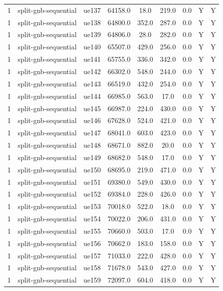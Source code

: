\begin{table}[ht]
\begin{tabular}{|c|c|c|c|c|c|c|c|c|}
1 & split-gnb-sequential & ue137 & 64158.0 & 18.0 & 219.0 & 0.0 & Y & Y \\
1 & split-gnb-sequential & ue138 & 64800.0 & 352.0 & 287.0 & 0.0 & Y & Y \\
1 & split-gnb-sequential & ue139 & 64806.0 & 28.0 & 282.0 & 0.0 & Y & Y \\
1 & split-gnb-sequential & ue140 & 65507.0 & 429.0 & 256.0 & 0.0 & Y & Y \\
1 & split-gnb-sequential & ue141 & 65755.0 & 336.0 & 342.0 & 0.0 & Y & Y \\
1 & split-gnb-sequential & ue142 & 66302.0 & 548.0 & 244.0 & 0.0 & Y & Y \\
1 & split-gnb-sequential & ue143 & 66519.0 & 432.0 & 254.0 & 0.0 & Y & Y \\
1 & split-gnb-sequential & ue144 & 66985.0 & 563.0 & 17.0 & 0.0 & Y & Y \\
1 & split-gnb-sequential & ue145 & 66987.0 & 224.0 & 430.0 & 0.0 & Y & Y \\
1 & split-gnb-sequential & ue146 & 67628.0 & 524.0 & 421.0 & 0.0 & Y & Y \\
1 & split-gnb-sequential & ue147 & 68041.0 & 603.0 & 423.0 & 0.0 & Y & Y \\
1 & split-gnb-sequential & ue148 & 68671.0 & 882.0 & 20.0 & 0.0 & Y & Y \\
1 & split-gnb-sequential & ue149 & 68682.0 & 548.0 & 17.0 & 0.0 & Y & Y \\
1 & split-gnb-sequential & ue150 & 68695.0 & 219.0 & 471.0 & 0.0 & Y & Y \\
1 & split-gnb-sequential & ue151 & 69380.0 & 549.0 & 430.0 & 0.0 & Y & Y \\
1 & split-gnb-sequential & ue152 & 69384.0 & 228.0 & 426.0 & 0.0 & Y & Y \\
1 & split-gnb-sequential & ue153 & 70018.0 & 522.0 & 18.0 & 0.0 & Y & Y \\
1 & split-gnb-sequential & ue154 & 70022.0 & 206.0 & 431.0 & 0.0 & Y & Y \\
1 & split-gnb-sequential & ue155 & 70660.0 & 503.0 & 17.0 & 0.0 & Y & Y \\
1 & split-gnb-sequential & ue156 & 70662.0 & 183.0 & 158.0 & 0.0 & Y & Y \\
1 & split-gnb-sequential & ue157 & 71033.0 & 222.0 & 428.0 & 0.0 & Y & Y \\
1 & split-gnb-sequential & ue158 & 71678.0 & 543.0 & 427.0 & 0.0 & Y & Y \\
1 & split-gnb-sequential & ue159 & 72097.0 & 604.0 & 418.0 & 0.0 & Y & Y \\

\end{tabular}
\end{table}
